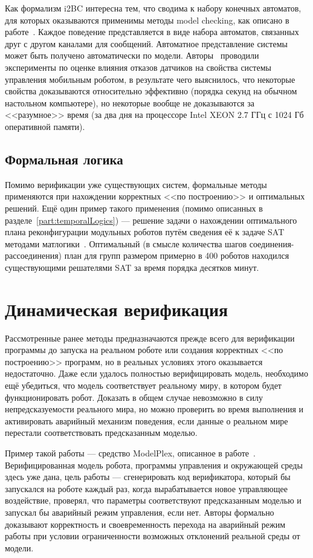 \documentclass[conference]{IEEEtran}
\begin{document}
Как формализм i2BC интересна тем, что сводима к набору конечных 
автоматов, для которых оказываются применимы методы model checking, как описано 
в работе~\cite{kiekbusch2014behaviour}. Каждое поведение представляется в виде 
набора автоматов, связанных друг с другом каналами для сообщений. Автоматное представление системы 
может быть получено автоматически по модели. Авторы~\cite{kiekbusch2014behaviour}
проводили эксперименты по оценке влияния отказов датчиков 
на свойства системы управления мобильным роботом, в 
результате чего выяснилось, что некоторые свойства доказываются относительно 
эффективно (порядка секунд на обычном настольном компьютере), но некоторые 
вообще не доказываются за <<разумное>> время (за два дня на процессоре 
Intel XEON 2.7 ГГц с 1024 Гб оперативной памяти).

\subsection{Формальная логика}
Помимо верификации уже существующих систем, формальные методы применяются при 
нахождении корректных <<по построению>> и оптимальных решений. Ещё один пример 
такого применения (помимо описанных в разделе~\ref{part:temporalLogics}) --- решение 
задачи о нахождении оптимального плана реконфигурации модульных роботов путём 
сведения её к задаче SAT методами матлогики~\cite{gorbenko2012reconfigurable}. 
Оптимальный (в смысле количества шагов соединения-рассоединения) план для групп 
размером примерно в 400 роботов находился существующими решателями SAT за время 
порядка десятков минут.

\section{Динамическая верификация}
Рассмотренные ранее методы предназначаются прежде всего для верификации 
программы до запуска на реальном роботе или создания корректных <<по построению>> 
программ, но в реальных условиях этого оказывается недостаточно. Даже если 
удалось полностью верифицировать модель, необходимо ещё убедиться, что модель 
соответствует реальному миру, в котором будет функционировать робот. 
Доказать в общем случае невозможно в силу непредсказуемости реального мира, 
но можно проверить во время выполнения и активировать аварийный
механизм поведения, если данные о реальном мире перестали соответствовать 
предсказанным моделью.

Пример такой работы --- средство ModelPlex, описанное в работе~\cite{mitsch2014modelplex}. 
Верифицированная модель робота, программы управления и окружающей среды здесь 
уже дана, цель работы --- сгенерировать код верификатора, который бы запускался 
на роботе каждый раз, когда вырабатывается новое управляющее воздействие, 
проверял, что параметры соответствуют предсказанным моделью и запускал бы 
аварийный режим управления, если нет. Авторы формально доказывают корректность 
и своевременность перехода на аварийный режим работы при условии ограниченности
возможных отклонений реальной среды от модели.
\end{document}
